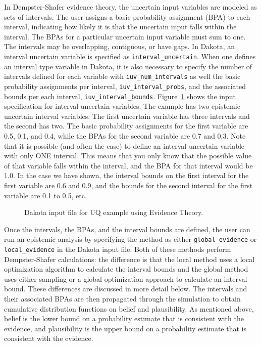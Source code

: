 In Dempster-Shafer evidence theory, the uncertain input variables are
modeled as sets of intervals. The user assigns a basic probability
assignment (BPA) to each interval, indicating how likely it is that
the uncertain input falls within the interval. The BPAs for a
particular uncertain input variable must sum to one. The intervals
may be overlapping, contiguous, or have gaps. In Dakota, an interval
uncertain variable is specified as \texttt{interval\_uncertain}. When
one defines an interval type variable in Dakota, it is also necessary
to specify the number of intervals defined for each variable with
\texttt{iuv\_num\_intervals} as well the basic probability assignments
per interval, \texttt{iuv\_interval\_probs}, and the associated bounds
per each interval, \texttt{iuv\_interval\_bounds}. 
Figure~\ref{uq:figure16} shows the input specification for interval
uncertain variables. 
The example has two epistemic uncertain interval variables. 
The first uncertain
variable has three intervals and the second has two. The basic
probability assignments for the first variable are 0.5, 0.1, and 0.4,
while the BPAs for the second variable are 0.7 and 0.3. Note that it
is possible (and often the case) to define an interval uncertain
variable with only ONE interval. This means that you only know that
the possible value of that variable falls within the interval, and the
BPA for that interval would be 1.0. In the case we have shown, the
interval bounds on the first interval for the first variable are 0.6
and 0.9, and the bounds for the second interval for the first variable
are 0.1 to 0.5, etc.

\begin{figure}
  \centering
  \begin{bigbox}
    \begin{small}
    \end{small}
  \end{bigbox}
\caption{Dakota input file for UQ example using Evidence Theory.}
\label{uq:figure16}
\end{figure}

Once the intervals, the BPAs, and the interval bounds are defined, 
the user can run an epistemic analysis by specifying the method as 
either \texttt{global\_evidence} or 
\texttt{local\_evidence} in the Dakota input file. 
Both of these methods perform Dempster-Shafer calculations:  
the difference is that the local method uses a local optimization 
algorithm to calculate the interval bounds and the global 
method uses either sampling or a global optimization approach to 
calculate an interval bound. These differences are discussed in 
more detail below. 
The intervals and their associated BPAs are then propagated through
the simulation to obtain cumulative distribution functions on belief
and plausibility. As mentioned above, belief is the lower bound on a
probability estimate that is consistent with the evidence, and
plausibility is the upper bound on a probability estimate that is
consistent with the evidence. 

